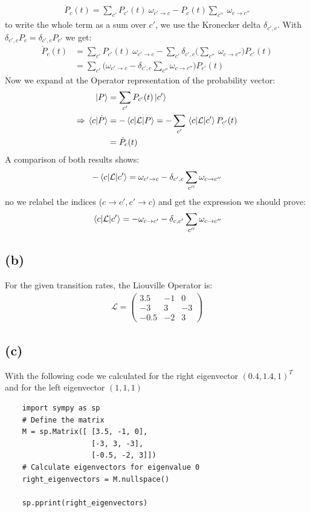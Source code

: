 \documentclass{article}
\begin{document}
\begin{align}
    \dot{P}_c(t)=\sum_{c'}P_{c'}(t)\ \omega_{c'\rightarrow c}-P_{c}(t)\sum_{c''}\ \omega_{c\rightarrow c''}
\end{align}
to write the whole term as a sum over $c'$, we use the Kronecker delta $\delta_{c',c}$. With $\delta_{c',c}P_c=\delta_{c',c}P_{c'}$ we get:
\begin{align}
    \dot{P}_c(t)&=\sum_{c'}P_{c'}(t)\ \omega_{c'\rightarrow c}- \sum_{c'}\delta_{c',c}\Big(\sum_{c''}\ \omega_{c\rightarrow c''}\Big)P_{c'}(t)\\
    &=\sum_{c'}\Big(\omega_{c'\rightarrow c}- \delta_{c',c}\sum_{c''}\omega_{c\rightarrow c''}\Big)P_{c'}(t)
\end{align}
Now we expand at the Operator representation of the probability vector:
\begin{align}
    \ket{{P}}&=\sum_{c'} P_{c'}(t)\ket{c'}\\
    \Rightarrow \braket*{c}{\dot{P}}&=-\mel{c}{\mathcal{L}}{P}=-\sum_{c'}\mel{c}{\mathcal{L}}{c'}P_{c'}(t)\\
    &=\dot{P}_{c}(t)
\end{align}
A comparison of both results shows:
\begin{align}
    -\mel{c}{\mathcal{L}}{c'}=\omega_{c'\rightarrow c}- \delta_{c',c}\sum_{c''}\omega_{c\rightarrow c''}
\end{align}
no we relabel the indices ($c\rightarrow c', c'\rightarrow c$) and get the expression we should prove:
\begin{align}
    \mel{c}{\mathcal{L}}{c'}=-\omega_{c\rightarrow c'}- \delta_{c,c'}\sum_{c''}\omega_{c\rightarrow c''}
\end{align}

\subsection*{(b)}
For the given transition rates, the Liouville Operator is:
\begin{align}
    \mathcal{L}=\begin{pmatrix}
        3.5 & -1 & 0\\
        -3 & 3 & -3 \\
        -0.5 & -2 & 3
    \end{pmatrix}
\end{align}

\subsection*{(c)}
With the following code we calculated for the right eigenvector $(0.4, 1.4, 1)^T$
and for the left eigenvector $(1, 1, 1)$
\begin{verbatim}
    import sympy as sp
    # Define the matrix
    M = sp.Matrix([ [3.5, -1, 0],
                    [-3, 3, -3],
                    [-0.5, -2, 3]])
    # Calculate eigenvectors for eigenvalue 0
    right_eigenvectors = M.nullspace()

    sp.pprint(right_eigenvectors)
\end{verbatim}
\end{document}
